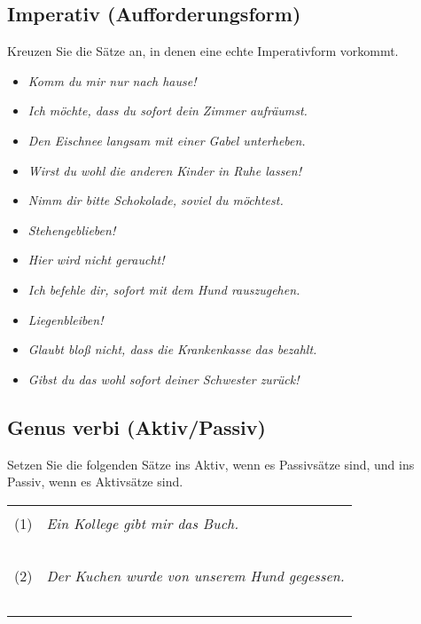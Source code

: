\documentclass[12pt,a4paper,twoside]{article}
\newcommand{\praesenzaufgabe}{}
\newcommand{\FUBreak}{\clearpage}
\newcommand{\praesenzaufgabe}{\textbf{Präsenzaufgabe!}\ |\ }
\newcommand{\FUBreak}{}
\newcommand{\Lf}{
  \setlength{\itemsep}{1pt}
  \setlength{\parskip}{0pt}
  \setlength{\parsep}{0pt}
}
\begin{document}
\begin{ignorable}
\subsection{\praesenzaufgabe Imperativ (Aufforderungsform)}

Kreuzen Sie die Sätze an, in denen eine echte Imperativform vorkommt.

\begin{itemize}[label=\Square]\Lf
  \item \textit{Komm du mir nur nach hause!}
  \item \textit{Ich möchte, dass du sofort dein Zimmer aufräumst.}
  \item \textit{Den Eischnee langsam mit einer Gabel unterheben.}
  \item \textit{Wirst du wohl die anderen Kinder in Ruhe lassen!}
  \item \textit{Nimm dir bitte Schokolade, soviel du möchtest.}
  \item \textit{Stehengeblieben!}
  \item \textit{Hier wird nicht geraucht!}
  \item \textit{Ich befehle dir, sofort mit dem Hund rauszugehen.}
  \item \textit{Liegenbleiben!}
  \item \textit{Glaubt bloß nicht, dass die Krankenkasse das bezahlt.}
  \item \textit{Gibst du das wohl sofort deiner Schwester zurück!}
\end{itemize}

\end{ignorable}

\FUBreak

\subsection{\praesenzaufgabe Genus verbi (Aktiv\slash Passiv)}

Setzen Sie die folgenden Sätze ins Aktiv, wenn es Passivsätze sind, und ins Passiv, wenn es Aktivsätze sind.

\begin{center}
  \begin{tabular}[h]{cp{}}
    & \\
    (1) & \textit{Ein Kollege gibt mir das Buch.} \\
    & \\
    &\\\cline{2-2}
    & \\
    &\\\cline{2-2}
    & \\
    (2) & \textit{Der Kuchen wurde von unserem Hund gegessen.} \\
    & \\
    &\\\cline{2-2}
    & \\
    &\\\cline{2-2}
    & \\
  \end{tabular}
\end{center}
\end{document}
